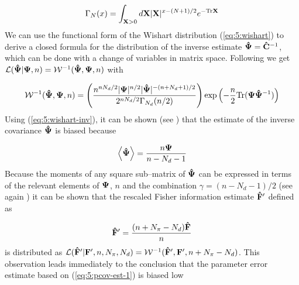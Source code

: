 \begin{equation}
\label{eq:5:gengamma}
\Gamma_N(x) = \int_{\mathbf{X}>0}d\mathbf{X}\vert\mathbf{X}\vert^{x-(N+1)/2}e^{-{\rm Tr}\mathbf{X}}
\end{equation}
%
We can use the functional form of the Wishart distribution (\ref{eq:5:wishart}) to derive a closed formula for the distribution of the inverse estimate $\mathbf{\hat{\Psi}}=\mathbf{\hat{C}}^{-1}$, which can be done with a change of variables in matrix space. Following \citep{Taylor12} we get $\mathcal{L}(\mathbf{\hat{\Psi}}\vert\mathbf{\Psi},n) = \mathcal{W}^{-1}(\mathbf{\hat{\Psi}},\mathbf{\Psi},n)$ with 

\begin{equation}
\label{eq:5:wishart-inv}
\mathcal{W}^{-1}(\mathbf{\hat{\Psi}},\mathbf{\Psi},n) = \left(\frac{n^{nN_d/2}\vert \mathbf{\Psi}\vert^{n/2}\vert\mathbf{\hat{\Psi}}\vert^{-(n+N_d+1)/2}}{2^{nN_d/2}\Gamma_{N_d}(n/2)}\right)\exp\left(-\frac{n}{2}{\rm Tr}(\mathbf{\Psi}\mathbf{\hat{\Psi}}^{-1})\right)
\end{equation}
%
Using (\ref{eq:5:wishart-inv}), it can be shown (see \citep{MasumotoWishart}) that the estimate of the inverse covariance $\mathbf{\hat{\Psi}}$ is biased because

\begin{equation}
\label{eq:5:inv-bias}
\left\langle\mathbf{\hat{\Psi}}\right\rangle = \frac{n\mathbf{\Psi}}{n-N_d-1}
\end{equation} 
%
Because the moments of any square sub--matrix of $\mathbf{\hat{\Psi}}$ can be expressed in terms of the relevant elements of $\mathbf{\Psi}$, $n$ and the combination $\gamma=(n-N_d-1)/2$ (see again \citep{MasumotoWishart}) it can be shown that the rescaled Fisher information estimate $\mathbf{\hat{F}}'$ defined as 

\begin{equation}
\label{eq:5:rescaledF}
\mathbf{\hat{F}}' = \frac{(n+N_\pi-N_d)\mathbf{\hat{F}}}{n}
\end{equation}
%
is distributed as $\mathcal{L}(\mathbf{\hat{F}}'\vert\mathbf{F}',n,N_\pi,N_d) = \mathcal{W}^{-1}(\mathbf{\hat{F}}',\mathbf{F}',n+N_\pi-N_d)$. This observation leads immediately to the conclusion that the parameter error estimate based on (\ref{eq:5:pcov-est-1}) is biased low

